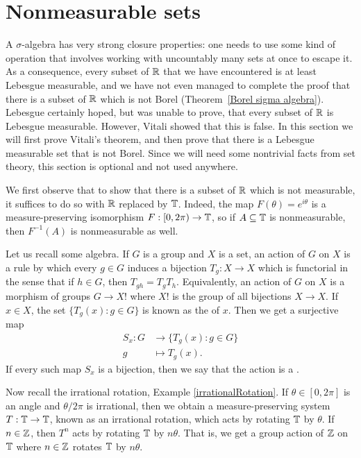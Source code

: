 \section{Nonmeasurable sets}
\label{nonmeasurable sets}
A $\sigma$-algebra has very strong closure properties: one needs to use some kind of operation that involves working with uncountably many sets at once to escape it.
As a consequence, every subset of $\mathbb{R}$ that we have encountered is at least Lebesgue measurable, and we have not even managed to complete the proof that there is a subset of $\mathbb{R}$ which is not Borel (Theorem~\ref{Borel sigma algebra}).
Lebesgue certainly hoped, but was unable to prove, that every subset of $\mathbb{R}$ is Lebesgue measurable.
However, Vitali showed that this is false. In this section we will first prove Vitali's theorem, and then prove that there is a Lebesgue measurable set that is not Borel.
Since we will need some nontrivial facts from set theory, this section is optional and not used anywhere.

\begin{subsec}
We first observe that to show that there is a subset of $\mathbb{R}$ which is not measurable, it suffices to do so with $\mathbb{R}$ replaced by $\mathbb{T}$.
Indeed, the map $F(\theta) = e^{i\theta}$ is a measure-preserving isomorphism $F: [0, 2\pi) \to \mathbb{T}$, so if $A \subseteq \mathbb{T}$ is nonmeasurable, then $F^{-1}(A)$ is nonmeasurable as well.
\end{subsec}

\begin{subsec}
Let us recall some algebra.
If $G$ is a group and $X$ is a set, an action of $G$ on $X$ is a rule by which every $g \in G$ induces a bijection $T_g: X \to X$ which is functorial in the sense that if $h \in G$, then $T_{gh} = T_gT_h$.
Equivalently, an action of $G$ on $X$ is a morphism of groups $G \to X!$ where $X!$ is the group of all bijections $X \to X$.
If $x \in X$, the set $\{T_g(x): g \in G\}$ is known as the  of $x$.
Then we get a surjective map
\begin{align*}
S_x: G &\to \{T_g(x): g \in G\}\\
g &\mapsto T_g(x).
\end{align*}
If every such map $S_x$ is a bijection, then we say that the action is a .
\end{subsec}

\begin{subsec}
Now recall the irrational rotation, Example \ref{irrationalRotation}.
If $\theta \in [0, 2\pi]$ is an angle and $\theta/2\pi$ is irrational, then we obtain a measure-preserving system $T: \mathbb{T} \to \mathbb{T}$, known as an irrational rotation, which acts by rotating $\mathbb{T}$ by $\theta$.
If $n \in \mathbb{Z}$, then $T^n$ acts by rotating $\mathbb{T}$ by $n\theta$.
That is, we get a group action of $\mathbb{Z}$ on $\mathbb{T}$ where $n \in \mathbb{Z}$ rotates $\mathbb{T}$ by $n\theta$.
\end{subsec}

